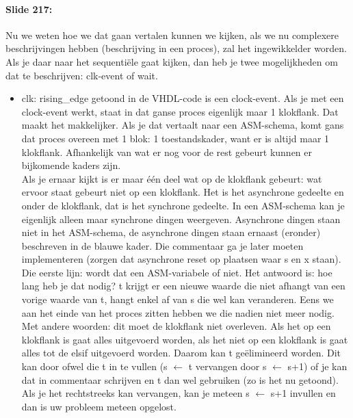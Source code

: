 \documentclass[10pt,a4paper]{book}
\begin{document}
\paragraph{Slide 217:} Nu we weten hoe we dat gaan vertalen kunnen we kijken, als we nu complexere beschrijvingen hebben (beschrijving in een proces), zal het ingewikkelder worden. Als je daar naar het sequenti\"ele gaat kijken, dan heb je twee mogelijkheden om dat te beschrijven: clk-event of wait.	
\begin{itemize}
\item clk: rising\_edge getoond in de VHDL-code is een clock-event. Als je met een clock-event werkt, staat in dat ganse proces eigenlijk maar 1 klokflank. Dat maakt het makkelijker. Als je dat vertaalt naar een ASM-schema, komt gans dat proces overeen met 1 blok: 1 toestandskader, want er is altijd maar 1 klokflank. Afhankelijk van wat er nog voor de rest gebeurt kunnen er bijkomende kaders zijn.\\
Als je ernaar kijkt is er maar \'e\'en deel wat op de klokflank gebeurt: wat ervoor staat gebeurt niet op een klokflank. Het is het asynchrone gedeelte en onder de klokflank, dat is het synchrone gedeelte. In een ASM-schema kan je eigenlijk alleen maar synchrone dingen weergeven. Asynchrone dingen staan niet in het ASM-schema, de asynchrone dingen staan ernaast (eronder) beschreven in de blauwe kader. Die commentaar ga je later moeten implementeren (zorgen dat asynchrone reset op plaatsen waar s en x staan). Die eerste lijn: wordt dat een ASM-variabele of niet. Het antwoord is: hoe lang heb je dat nodig? t krijgt er een nieuwe waarde die niet afhangt van een vorige waarde van t, hangt enkel af van s die wel kan veranderen. Eens we aan het einde van het proces zitten hebben we die nadien niet meer nodig. Met andere woorden: dit moet de klokflank niet overleven. Als het op een klokflank is gaat alles uitgevoerd worden, als het niet op een klokflank is gaat alles tot de elsif uitgevoerd worden. Daarom kan t ge\"elimineerd worden. Dit kan door ofwel die t in te vullen (s $\leftarrow$ t vervangen door s $\leftarrow$ s+1) of je kan dat in commentaar schrijven en t dan wel gebruiken (zo is het nu getoond). Als je het rechtstreeks kan vervangen, kan je meteen s $\leftarrow$ s+1 invullen en dan is uw probleem meteen opgelost.	


\end{itemize}
\end{document}
